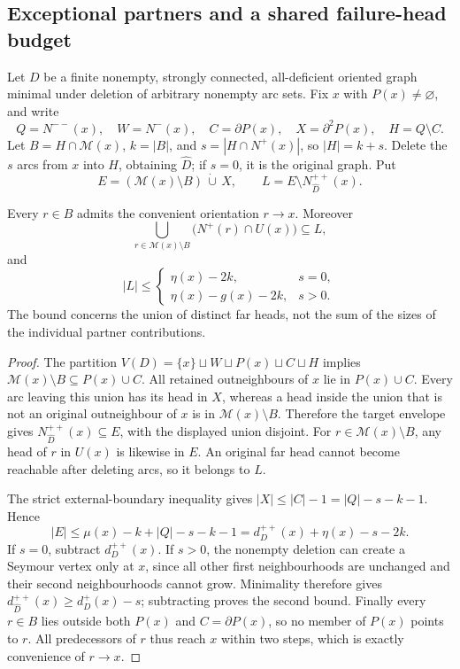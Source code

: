 \subsection{Exceptional partners and a shared failure-head budget}
\label{sec:partner-budget}

Let $D$ be a finite nonempty, strongly connected, all-deficient oriented
graph minimal under deletion of arbitrary nonempty arc sets. Fix $x$
with $P(x)\ne\varnothing$, and write
\[
 Q=N^{--}(x),\quad W=N^-(x),\quad C=\partial P(x),
 \quad X=\partial^2P(x),\quad H=Q\setminus C.
\]
Let $B=H\cap\mathcal M(x)$, $k=|B|$, and
$s=|H\cap N^+(x)|$, so $|H|=k+s$. Delete the $s$ arcs from $x$
into $H$, obtaining $\widehat D$; if $s=0$, it is the original graph.
Put
\[
 E=(\mathcal M(x)\setminus B)\,\dot\cup\,X,
 \qquad L=E\setminus N^{++}_{\widehat D}(x).
\]

\begin{lemma}
\label{lem:partner-head-budget}
Every $r\in B$ admits the convenient orientation $r\to x$.
Moreover
\[
 \bigcup_{r\in\mathcal M(x)\setminus B}
       \bigl(N^+(r)\cap U(x)\bigr)\subseteq L,
\]
and
\[
 |L|\le
 \begin{cases}
   \eta(x)-2k,&s=0,\\
   \eta(x)-g(x)-2k,&s>0.
 \end{cases}
\]
The bound concerns the union of distinct far heads, not the sum of
the sizes of the individual partner contributions.
\end{lemma}
\begin{proof}
The partition $V(D)=\{x\}\sqcup W\sqcup P(x)\sqcup C\sqcup H$
implies $\mathcal M(x)\setminus B\subseteq P(x)\cup C$.
All retained outneighbours of $x$ lie in $P(x)\cup C$.
Every arc leaving this union has its head in $X$, whereas a head
inside the union that is not an original outneighbour of $x$ is in
$\mathcal M(x)\setminus B$. Therefore the target envelope gives
$N^{++}_{\widehat D}(x)\subseteq E$, with the displayed union disjoint.
For $r\in\mathcal M(x)\setminus B$, any head of $r$ in $U(x)$ is
likewise in $E$. An original far head cannot become reachable after
deleting arcs, so it belongs to $L$.

The strict external-boundary inequality gives
$|X|\le |C|-1=|Q|-s-k-1$. Hence
\[
 |E|\le\mu(x)-k+|Q|-s-k-1
       =d_D^{++}(x)+\eta(x)-s-2k.
\]
If $s=0$, subtract $d_D^{++}(x)$. If $s>0$, the nonempty deletion
can create a Seymour vertex only at $x$, since all other first
neighbourhoods are unchanged and their second neighbourhoods cannot
grow. Minimality therefore gives
$d^{++}_{\widehat D}(x)\ge d_D^+(x)-s$; subtracting proves the second
bound. Finally every $r\in B$ lies outside both $P(x)$ and
$C=\partial P(x)$, so no member of $P(x)$ points to $r$.
All predecessors of $r$ thus reach $x$ within two steps, which is
exactly convenience of $r\to x$.
\end{proof}

